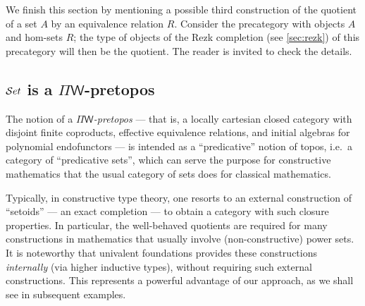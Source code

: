 We finish this section by mentioning a possible third construction of the quotient of a set $A$ by an equivalence relation $R$.
Consider the precategory with objects $A$ and hom-sets $R$; the type of objects of the Rezk completion
%
(see \cref{sec:rezk}) of this precategory will then be the
quotient. The reader is invited to check the details.

%
%
%

\subsection{\texorpdfstring{$\mathcal{S}et$}{Set} is a \texorpdfstring{$\Pi\mathsf{W}$}{ΠW}-pretopos}
\label{subsec:piw}

%

The notion of a \emph{$\Pi\mathsf{W}$-pretopos}
%
--- that is, a locally cartesian closed category
%
%
with disjoint finite coproducts, effective equivalence relations, and initial algebras for polynomial endofunctors --- is intended as a ``predicative''
%
notion of topos, i.e.\ a category of ``predicative sets'', which can serve the purpose for constructive mathematics
%
that the usual category of sets does for classical
%
mathematics.

Typically, in constructive type theory, one resorts to an external construction of ``setoids'' --- an exact completion --- to obtain a category with such closure properties.
%
  In particular, the well-behaved quotients are required for many constructions in mathematics that usually involve (non-constructive) power sets.  It is noteworthy that univalent foundations provides these constructions \emph{internally} (via higher inductive types), without requiring such external constructions.  This represents a powerful advantage of our approach, as we shall see in subsequent examples.

